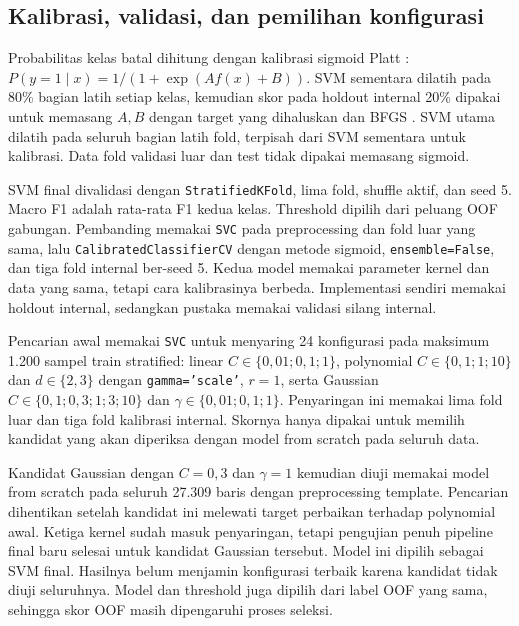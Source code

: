 \subsection{Kalibrasi, validasi, dan pemilihan konfigurasi}
Probabilitas kelas batal dihitung dengan kalibrasi sigmoid Platt \cite{ref:platt_prob}: $P(y=1\mid x)=1/(1+\exp(Af(x)+B))$. SVM sementara dilatih pada 80\% bagian latih setiap kelas, kemudian skor pada holdout internal 20\% dipakai untuk memasang $A,B$ dengan target yang dihaluskan dan BFGS \cite{ref:scipy_bfgs}. SVM utama dilatih pada seluruh bagian latih fold, terpisah dari SVM sementara untuk kalibrasi. Data fold validasi luar dan test tidak dipakai memasang sigmoid.

SVM final divalidasi dengan \texttt{StratifiedKFold}, lima fold, shuffle aktif, dan seed 5. Macro F1 adalah rata-rata F1 kedua kelas. Threshold dipilih dari peluang OOF gabungan. Pembanding memakai \texttt{SVC} pada preprocessing dan fold luar yang sama, lalu \texttt{CalibratedClassifierCV} dengan metode sigmoid, \texttt{ensemble=False}, dan tiga fold internal ber-seed 5. Kedua model memakai parameter kernel dan data yang sama, tetapi cara kalibrasinya berbeda. Implementasi sendiri memakai holdout internal, sedangkan pustaka memakai validasi silang internal.

Pencarian awal memakai \texttt{SVC} untuk menyaring 24 konfigurasi pada maksimum 1.200 sampel train stratified: linear $C\in\{0{,}01;0{,}1;1\}$, polynomial $C\in\{0{,}1;1;10\}$ dan $d\in\{2,3\}$ dengan \texttt{gamma='scale'}, $r=1$, serta Gaussian $C\in\{0{,}1;0{,}3;1;3;10\}$ dan $\gamma\in\{0{,}01;0{,}1;1\}$. Penyaringan ini memakai lima fold luar dan tiga fold kalibrasi internal. Skornya hanya dipakai untuk memilih kandidat yang akan diperiksa dengan model from scratch pada seluruh data.

Kandidat Gaussian dengan $C=0{,}3$ dan $\gamma=1$ kemudian diuji memakai model from scratch pada seluruh 27.309 baris dengan preprocessing template. Pencarian dihentikan setelah kandidat ini melewati target perbaikan terhadap polynomial awal. Ketiga kernel sudah masuk penyaringan, tetapi pengujian penuh pipeline final baru selesai untuk kandidat Gaussian tersebut. Model ini dipilih sebagai SVM final. Hasilnya belum menjamin konfigurasi terbaik karena kandidat tidak diuji seluruhnya. Model dan threshold juga dipilih dari label OOF yang sama, sehingga skor OOF masih dipengaruhi proses seleksi.

